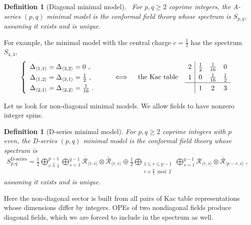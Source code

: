 \documentclass[12pt, a4paper]{article}
\theoremstyle{break}
\newtheorem{defn}[exo]{Definition}
\begin{document}
\begin{defn}[Diagonal minimal model]
 ~\label{def:dmm}
 For $p,q\geq 2$ coprime integers, the A-series $(p,q)$ minimal model is the conformal field theory whose spectrum is $S_{p, q}$, assuming it exists and is unique.
\end{defn}
For example, the minimal model with the central charge $c=\frac12$ has the spectrum $S_{4,3}$, 
\begin{align}
\renewcommand{\arraystretch}{1.3}
 \left\{\begin{array}{l} \Delta_{\langle 1,1\rangle}=\Delta_{\langle 3,2\rangle} = 0 \ , \\ \Delta_{\langle 1,2\rangle} =\Delta_{\langle 3,1\rangle} = \frac12 \ , \\ \Delta_{\langle 2,1\rangle} =\Delta_{\langle 2,2\rangle} = \frac{1}{16} \ .\end{array}\right. 
 \qquad \iff \quad \text{the Kac table} \quad 
 \begin{array}{c|ccc} 2 & \frac{1}{2} & \frac{1}{16} & 0 \\ 1 & 0 & \frac{1}{16} & \frac{1}{2} \\  \hline & 1 & 2 & 3 \end{array} 
\end{align}

Let us look for non-diagonal minimal models. We  allow fields to have nonzero integer spins. 

\begin{defn}[D-series minimal model]
 For $p,q\geq 2$ coprime integers with $p$ even, the D-series $(p,q)$ minimal model is the conformal field theory whose spectrum is 
\begin{align}
 S_{p,q}^\text{D-series} = \frac12 \bigoplus_{r\overset{2}{=}1}^{p-1} \bigoplus_{s=1}^{q-1} \mathcal{R}_{ \langle r,s \rangle} \otimes \bar{\mathcal{R}}_{\langle r,s \rangle}\oplus \frac12\bigoplus_{\substack{1\leq r\leq p-1 \\ r\equiv \frac{p}{2}\bmod 2}} \bigoplus_{s=1}^{q-1} \mathcal{R}_{\langle r,s \rangle} \otimes \bar{\mathcal{R}}_{\langle p-r,s\rangle}\ ,
 \label{eq:sds}
\end{align}
assuming it exists and is unique.
\end{defn}
Here the non-diagonal sector is built from all pairs of Kac table representations whose dimensions differ by integers. OPEs of two nondiagonal fields produce diagonal fields, which we are forced to include in the spectrum as well. 
\end{document}
